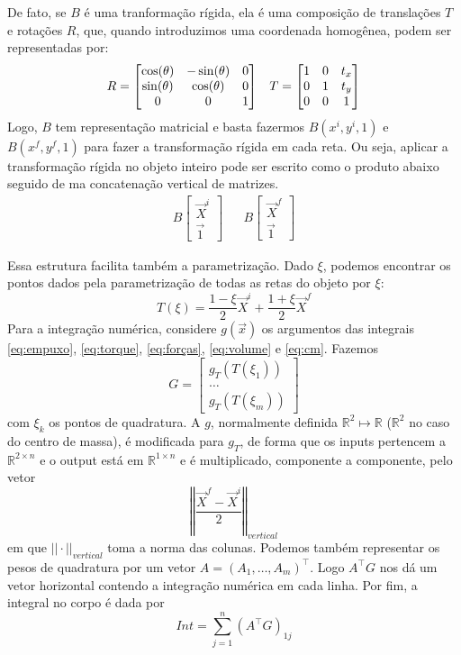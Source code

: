 \documentclass[
	12pt,				%
	oneside,			%
	a4paper,			%
	]{article}
\begin{document}
    De fato, se $B$ é uma tranformação rígida, ela é uma composição de translações $T$ e rotações $R$, que, quando introduzimos uma coordenada homogênea, podem ser representadas por:
    \begin{align}
        R = \begin{bmatrix}
            \cos(\theta) & -\sin(\theta) & 0 \\
            \sin(\theta) & \cos(\theta) & 0 \\
            0 & 0 & 1
        \end{bmatrix} && T = \begin{bmatrix}
            1 & 0 & t_x \\
            0 & 1 & t_y \\
            0 & 0 & 1 
        \end{bmatrix} \notag
    \end{align}
    Logo, $B$ tem representação matricial e basta fazermos $B (x^i, y^i, 1)$ e $B (x^f, y^f, 1)$ para fazer a transformação rígida em cada reta. Ou seja, aplicar a transformação rígida no objeto inteiro pode ser escrito como o produto abaixo seguido de ma concatenação vertical de matrizes.
    \begin{align}
        B \begin{bmatrix}
            \vec{X}^i \\
            \vec{1}
        \end{bmatrix} && B \begin{bmatrix}
            \vec{X}^f \\
            \vec{1}
        \end{bmatrix}
    \end{align}
 
    Essa estrutura facilita também a parametrização. Dado $\xi$, podemos encontrar os pontos dados pela parametrização de todas as retas do objeto por $\xi$:
    \[
        T(\xi) = \frac{1 - \xi}{2} \vec{X}^i + \frac{1 + \xi}{2}\vec{X}^f
    \]
    Para a integração numérica, considere $g(\vec{x})$ os argumentos das integrais \ref{eq:empuxo}, \ref{eq:torque}, \ref{eq:forças}, \ref{eq:volume} e \ref{eq:cm}. Fazemos
    \[
        G= \begin{bmatrix}
            g_T(T(\xi_1)) \\
            \dots \\
            g_T(T(\xi_m))
        \end{bmatrix}
    \] 
    com $\xi_k$ os pontos de quadratura. A $g$, normalmente definida $\mathbb{R}^2 \mapsto \mathbb{R}$ ($\mathbb{R}^2$ no caso do centro de massa), é modificada para $g_T$, de forma que os inputs pertencem a $\mathbb{R}^{2 \times n}$ e o output está em $\mathbb{R}^{1 \times n}$ e é multiplicado, componente a componente, pelo vetor
    \[
        \left\Vert \frac{\vec{X}^f - \vec{X}^i}{2} \right\Vert_{vertical}
    \]
    em que $||\cdot||_{vertical}$ toma a norma das colunas.
    Podemos também representar os pesos de quadratura por um vetor $A=(A_1, \dots, A_m)^\top$. Logo $A^\top G$ nos dá um vetor horizontal contendo a integração numérica em cada linha. Por fim, a integral no corpo é dada por
    \[
        Int = \sum_{j=1}^{n} (A^\top G)_{1j}
    \]
\end{document}
